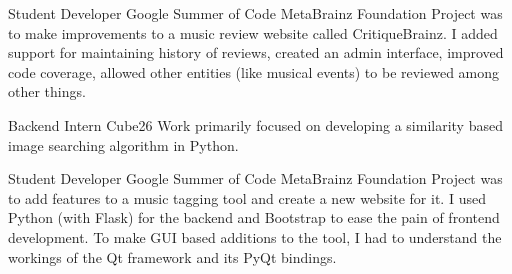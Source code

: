     {Student Developer}
    {Google Summer of Code}
    {MetaBrainz Foundation}
    {}
    {
        Project was to make improvements to a music review website called CritiqueBrainz.
        \linebreak
        I added support for maintaining history of reviews, created an admin interface,
        improved code coverage, allowed other entities (like musical events) to be reviewed among other things.
    }
    \vspace*{0.2\baselineskip}

    {Backend Intern}
    {Cube26}
    {}
    {}
    {
        Work primarily focused on developing a similarity based image searching algorithm in Python.
    }
    \vspace*{0.2\baselineskip}

    {Student Developer}
    {Google Summer of Code}
    {MetaBrainz Foundation}
    {}
    {
        Project was to add features to a music tagging tool and create a new website for it.
        \linebreak
        I used Python (with Flask) for the backend and Bootstrap to ease the pain of frontend development.
        To make GUI based additions to the tool, I had to understand the workings of the Qt framework and its PyQt bindings.
    }
    \vspace*{0.2\baselineskip}
